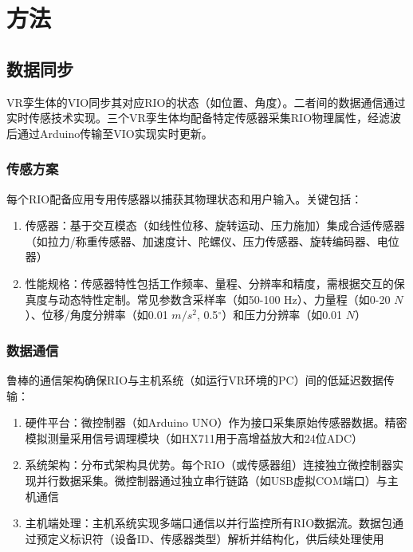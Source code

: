 \documentclass[runningheads]{llncs}
\begin{document}
\section{方法}

\subsection{数据同步}
VR孪生体的VIO同步其对应RIO的状态（如位置、角度）。二者间的数据通信通过实时传感技术实现。三个VR孪生体均配备特定传感器采集RIO物理属性，经滤波后通过Arduino传输至VIO实现实时更新。

\subsubsection{传感方案}
每个RIO配备应用专用传感器以捕获其物理状态和用户输入。关键包括：
\begin{enumerate}
  \item 传感器：基于交互模态（如线性位移、旋转运动、压力施加）集成合适传感器（如拉力/称重传感器、加速度计、陀螺仪、压力传感器、旋转编码器、电位器）
  \item 性能规格：传感器特性包括工作频率、量程、分辨率和精度，需根据交互的保真度与动态特性定制。常见参数含采样率（如50-100 Hz）、力量程（如0-20 $N$）、位移/角度分辨率（如0.01 $m/s^2$, 0.5$^\circ$）和压力分辨率（如0.01 $N$）
\end{enumerate}

\subsubsection{数据通信}
鲁棒的通信架构确保RIO与主机系统（如运行VR环境的PC）间的低延迟数据传输：
\begin{enumerate}
  \item 硬件平台：微控制器（如Arduino UNO）作为接口采集原始传感器数据。精密模拟测量采用信号调理模块（如HX711用于高增益放大和24位ADC）
  \item 系统架构：分布式架构具优势。每个RIO（或传感器组）连接独立微控制器实现并行数据采集。微控制器通过独立串行链路（如USB虚拟COM端口）与主机通信
  \item 主机端处理：主机系统实现多端口通信以并行监控所有RIO数据流。数据包通过预定义标识符（设备ID、传感器类型）解析并结构化，供后续处理使用
\end{enumerate}
\end{document}
